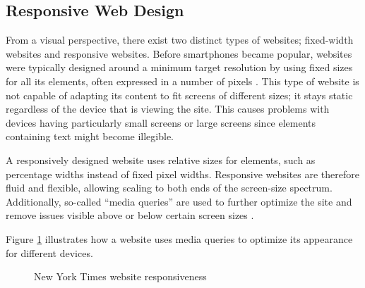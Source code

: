 \documentclass[a4paper,12pt]{article}
\begin{document}
\subsection{Responsive Web Design}
\label{Theory_responsiveWeb}
From a visual perspective, there exist two distinct types of websites; fixed-width websites and responsive websites. Before smartphones became popular, websites were typically designed around a minimum target resolution by using fixed sizes for all its elements, often expressed in a number of pixels \cite{resp_web_2011}. This type of website is not capable of adapting its content to fit screens of different sizes; it stays static regardless of the device that is viewing the site. This causes problems with devices having particularly small screens or large screens since elements containing text might become illegible.

A responsively designed website uses relative sizes for elements, such as percentage widths instead of fixed pixel widths. Responsive websites are therefore fluid and flexible, allowing scaling to both ends of the screen-size spectrum. Additionally, so-called “media queries” are used to further optimize the site and remove issues visible above or below certain screen sizes \cite{resp_web_2011}.

Figure \ref{fig:responsiveness} illustrates how a website uses media queries to optimize its appearance for different devices.

\begin{figure}[h]%
	\centering
	\quad
	\caption{New York Times website responsiveness}%
	\label{fig:responsiveness}%
\end{figure}
\end{document}
